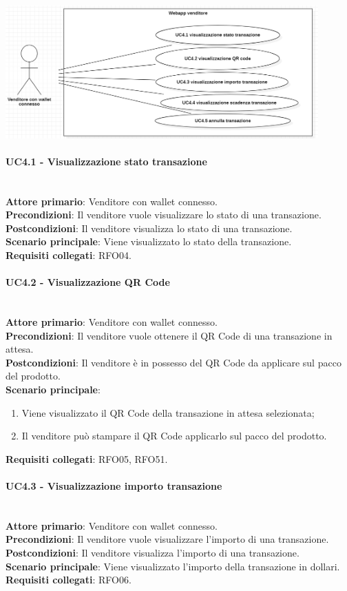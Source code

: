 \documentclass[a4paper, 12pt]{article}
\begin{document}
\includegraphics[width=0.9\textwidth]{UC_WAV4}

\paragraph{UC4.1 - Visualizzazione stato transazione}\\
\textbf{Attore primario}: Venditore con wallet connesso.\\
\textbf{Precondizioni}: Il venditore vuole visualizzare lo stato di una transazione.\\
\textbf{Postcondizioni}: Il venditore visualizza lo stato di una transazione.\\
\textbf{Scenario principale}: Viene visualizzato lo stato della transazione.\\
\textbf{Requisiti collegati}: RFO04.

\paragraph{UC4.2 - Visualizzazione QR Code}\\
\textbf{Attore primario}: Venditore con wallet connesso.\\
\textbf{Precondizioni}: Il venditore vuole ottenere il QR Code di una transazione in attesa.\\
\textbf{Postcondizioni}: Il venditore è in possesso del QR Code da applicare sul pacco del prodotto.\\
\textbf{Scenario principale}:
\begin{enumerate}
\item Viene visualizzato il QR Code della transazione in attesa selezionata;
\item Il venditore può stampare il QR Code applicarlo sul pacco del prodotto.
\end{enumerate}
\textbf{Requisiti collegati}: RFO05, RFO51.

\paragraph{UC4.3 - Visualizzazione importo transazione}\\
\textbf{Attore primario}: Venditore con wallet connesso.\\
\textbf{Precondizioni}: Il venditore vuole visualizzare l'importo di una transazione.\\
\textbf{Postcondizioni}: Il venditore visualizza l'importo di una transazione.\\
\textbf{Scenario principale}: Viene visualizzato l'importo della transazione in dollari.\\
\textbf{Requisiti collegati}: RFO06.
\end{document}
